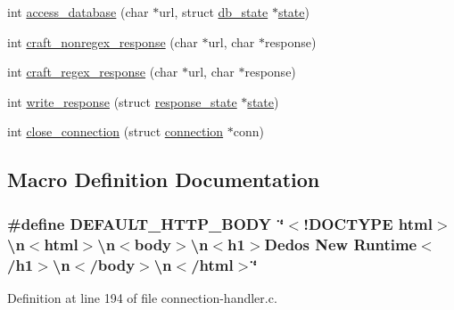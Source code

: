 \begin{DoxyCompactItemize}
\item 
int \hyperlink{connection-handler_8c_a371095605bf8a8222590bc46b2d38b59}{access\-\_\-database} (char $\ast$url, struct \hyperlink{structdb__state}{db\-\_\-state} $\ast$\hyperlink{http__parser_8c_adc6e5733fc3c22f0a7b2914188c49c90}{state})
\item 
int \hyperlink{connection-handler_8c_a40ddee505082e691c9e94a8afda7d4b5}{craft\-\_\-nonregex\-\_\-response} (char $\ast$url, char $\ast$response)
\item 
int \hyperlink{connection-handler_8c_a7cb78a1a29fdde2658e016d01287bf7a}{craft\-\_\-regex\-\_\-response} (char $\ast$url, char $\ast$response)
\item 
int \hyperlink{connection-handler_8c_ad3d7de1563a29af15a1bbef2fc7674c9}{write\-\_\-response} (struct \hyperlink{structresponse__state}{response\-\_\-state} $\ast$\hyperlink{http__parser_8c_adc6e5733fc3c22f0a7b2914188c49c90}{state})
\item 
int \hyperlink{connection-handler_8c_a0171242e91a6a1c18938b8aba84625e5}{close\-\_\-connection} (struct \hyperlink{structconnection}{connection} $\ast$conn)
\end{DoxyCompactItemize}


\subsection{Macro Definition Documentation}
\hypertarget{connection-handler_8c_a2870bb55c6ebf7807375ec589e6a1919}{
\subsubsection[{D\-E\-F\-A\-U\-L\-T\-\_\-\-H\-T\-T\-P\-\_\-\-B\-O\-D\-Y}]{\setlength{\rightskip}{0pt plus 5cm}\#define D\-E\-F\-A\-U\-L\-T\-\_\-\-H\-T\-T\-P\-\_\-\-B\-O\-D\-Y~\char`\"{}$<$!D\-O\-C\-T\-Y\-P\-E html$>$\textbackslash{}n$<$html$>$\textbackslash{}n$<$body$>$\textbackslash{}n$<$h1$>$Dedos New Runtime$<$/h1$>$\textbackslash{}n$<$/body$>$\textbackslash{}n$<$/html$>$\char`\"{}}}\label{connection-handler_8c_a2870bb55c6ebf7807375ec589e6a1919}


Definition at line 194 of file connection-\/handler.\-c.

